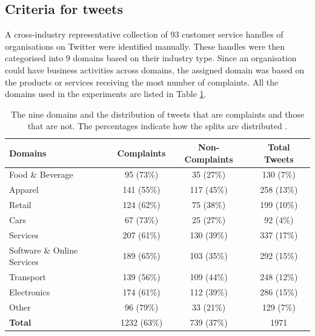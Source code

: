 \subsection{Criteria for tweets}
A cross-industry representative collection of 93 customer service handles of organisations on Twitter were identified manually. These handles were then categorised into 9 domains based on their industry type. Since an organisation could have business activities across domains, the assigned domain was based on the products or services receiving the most number of complaints. All the domains used in the experiments are listed in Table \ref{tab: domains}.
\begin{table}[ht]
    \captionsetup{font=small}
    \centering
    \begin{tabularx}{\textwidth}{|X|c|c|c|}
        \hline
        \rowcolor[gray]{0.7}
        \textbf{Domains}            & \textbf{Complaints} & \textbf{Non-Complaints} & \textbf{Total Tweets} \\
        \hline
        Food \& Beverage            & 95 \small{(73\%)}   & 35 \small{(27\%)}       & 130 \small{(7\%)}     \\
        \rowcolor[gray]{0.9}
        Apparel                     & 141 \small{(55\%)}  & 117 \small{(45\%)}      & 258 \small{(13\%)}    \\
        Retail                      & 124 \small{(62\%)}  & 75 \small{(38\%)}       & 199 \small{(10\%)}    \\
        \rowcolor[gray]{0.9}
        Cars                        & 67 \small{(73\%)}   & 25 \small{(27\%)}       & 92 \small{(4\%)}      \\
        Services                    & 207 \small{(61\%)}  & 130 \small{(39\%)}      & 337 \small{(17\%)}    \\
        \rowcolor[gray]{0.9}
        Software \& Online Services & 189 \small{(65\%)}  & 103 \small{(35\%)}      & 292 \small{(15\%)}    \\
        Transport                   & 139 \small{(56\%)}  & 109 \small{(44\%)}      & 248 \small{(12\%)}    \\
        \rowcolor[gray]{0.9}
        Electronics                 & 174 \small{(61\%)}  & 112 \small{(39\%)}      & 286 \small{(15\%)}    \\
        Other                       & 96 \small{(79\%)}   & 33 \small{(21\%)}       & 129 \small{(7\%)}     \\
        \hline
        \rowcolor[gray]{0.9}
        \textbf{Total}              & 1232 \small{(63\%)} & 739 \small{(37\%)}      & 1971                  \\
        \hline
    \end{tabularx}
    \caption{The nine domains and the distribution of tweets that are complaints and those that are not. The percentages indicate how the splits are distributed \cite{preotiuc-pietro_automatically_2019}.}
    \label{tab: domains}
\end{table}

